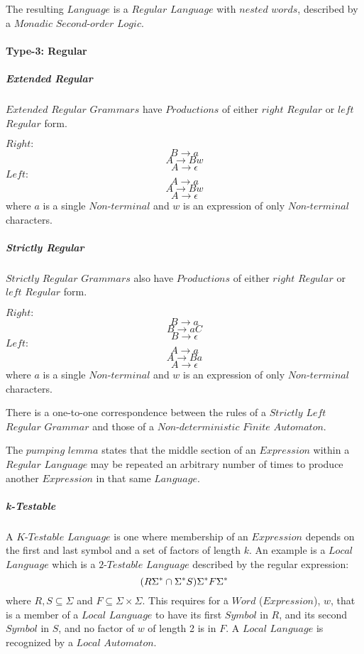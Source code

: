 \documentclass{article}
\begin{document}
    The resulting $Language$ is a $Regular$ $Language$ with $nested$
    $words$, described by a $Monadic$ $Second$-$order$ $Logic$.

\paragraph{Type-3: Regular}

    \subparagraph{Extended Regular}
    $Extended$ $Regular$ $Grammars$ have $Productions$ of either
    $right$ $Regular$ or $left$ $Regular$ form.

    $Right:$
    \[
        B \rightarrow a
    \]\[
        A \rightarrow Bw
    \]\[
        A \rightarrow \epsilon
    \]
    $Left:$
    \[
        A \rightarrow a
    \]\[
        A \rightarrow Bw
    \]\[
        A \rightarrow \epsilon
    \]
    where $a$ is a single $Non$-$terminal$ and $w$ is an expression of
    only $Non$-$terminal$ characters.

    \subparagraph{Strictly Regular}
    $Strictly$ $Regular$ $Grammars$ also have $Productions$ of either
    $right$ $Regular$ or $left$ $Regular$ form.

    $Right:$
    \[
        B \rightarrow a
    \]\[
        B \rightarrow aC
    \]\[
        B \rightarrow \epsilon
    \]
    $Left:$
    \[
        A \rightarrow a
    \]\[
        A \rightarrow Ba
    \]\[
        A \rightarrow \epsilon
    \]
    where $a$ is a single $Non$-$terminal$ and $w$ is an expression of
    only $Non$-$terminal$ characters.

    There is a one-to-one correspondence between the rules of a
    $Strictly$ $Left$ $Regular$ $Grammar$ and those of a
    $Non$-$deterministic$ $Finite$ $Automaton$.

    The $pumping$ $lemma$ states that the middle section of an
    $Expression$ within a $Regular$ $Language$ may be repeated an
    arbitrary number of times to produce another $Expression$ in that
    same $Language$.

    \subparagraph{k-Testable}
    A $K$-$Testable$ $Language$ is one where membership of an
    $Expression$ depends on the first and last symbol and a set of
    factors of length $k$. An example is a $Local$ $Language$ which is
    a $2$-$Testable$ $Language$ described by the regular expression:
    \[
        (R\Sigma^* \cap \Sigma^*S)\\\Sigma^*F\Sigma^*
    \]
    where $R,S \subseteq \Sigma$ and $F \subseteq \Sigma \times
    \Sigma$. This requires for a $Word$ ($Expression$), $w$, that is a
    member of a $Local$ $Language$ to have its first $Symbol$ in $R$,
    and its second $Symbol$ in $S$, and no factor of $w$ of length 2
    is in $F$. A $Local$ $Language$ is recognized by a $Local$
    $Automaton$.
\end{document}
